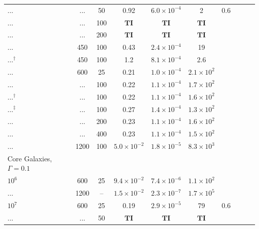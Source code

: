 \documentclass[usenatbib,fleqn]{mn2e}
\begin{document}
\begin{table}
\begin{threeparttable}
\begin{minipage}{18cm}
\begin{tabular}{lccccccccc}
... & ... & 50 & 0.92 & $ 6.0 \times 10^{ -4 }$ & 2 & 0.6\\
 ... & ... & 100 & $\mathbf{TI}$ & $\mathbf{TI}$ & $\mathbf{TI}$ \\
... & ... & 200 & $\mathbf{TI}$ & $\mathbf{TI}$ & $\mathbf{TI}$ \\
... & 450 & 100 & 0.43 & $ 2.4 \times 10^{ -4 }$ & 19 \\
...$^{\dagger}$ & 450 & 100 & 1.2 & $ 8.1 \times 10^{ -4 }$ & 2.6 \\
... & 600 & 25 & 0.21 & $ 1.0 \times 10^{ -4 }$ & $ 2.1 \times 10^{ 2 }$ \\
... & ... & 100 & 0.22 & $ 1.1 \times 10^{ -4 }$ & $ 1.7 \times 10^{ 2
}$ \\
...$^{\dagger}$ & ... & 100 & 0.22 & $ 1.1 \times 10^{ -4 }$ & $ 1.6 \times 10^{ 2 }$ \\
...$^{\ddagger}$  & ... & 100 & 0.27 & $ 1.4 \times 10^{ -4 }$ & $ 1.3 \times 10^{ 2
}$ \\
... & ... & 200 & 0.23 & $ 1.1 \times 10^{ -4 }$ & $ 1.6 \times 10^{ 2 }$ \\
... & ... & 400 & 0.23 & $ 1.1 \times 10^{ -4 }$ & $ 1.5 \times 10^{ 2 }$ \\
... & 1200 & 100 & $ 5.0 \times 10^{ -2 }$ & $ 1.8 \times 10^{ -5 }$ & $ 8.3 \times 10^{ 3 }$ \\
\hline
Core Galaxies, $\Gamma = 0.1$  &  & & & & & & & & \\
$    10^{ 6 }$ & 600 & 25 & $ 9.4 \times 10^{ -2 }$ & $ 7.4 \times 10^{ -6 }$ & $ 1.1 \times 10^{ 2 }$ \\
... & 1200 & -- & $ 1.5 \times 10^{ -2 }$ & $ 2.3 \times 10^{ -7 }$ & $ 1.7 \times 10^{ 5 }$ \\
$    10^{ 7 }$ & 600 & 25 & 0.19 & $ 2.9 \times 10^{ -5 }$ & 79 & 0.6 \\
... & ... & 50 & $\mathbf{TI}$ & $\mathbf{TI}$ & $\mathbf{TI}$ \\

\end{tabular}
\end{minipage}
\end{threeparttable}
\end{table}
\end{document}
